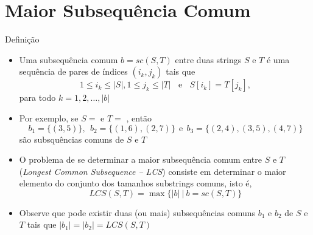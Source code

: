 \section{Maior Subsequência Comum}

\begin{frame}[fragile]{Definição}

    \begin{itemize}
        \item Uma subsequência comum $b = sc(S, T)$ entre duas strings $S$ e $T$ é uma sequência de
            pares de índices $(i_k, j_k)$ tais que 
        \[
            1\leq i_k\leq |S|, 1\leq j_k\leq |T| \ \ \ \ \mbox{e}\ \ \ \ S[i_k] = T[j_k],
        \]para todo $k = 1, 2, \ldots, |b|$

        \item  Por exemplo, se $S = $  e $T = $ , então
        \[
            b_1 = \lbrace (3, 5)\rbrace, \ \ b_2 = \lbrace (1, 6), (2, 7)\rbrace\ \ \mbox{e}\ \ b_3 = \lbrace (2, 4), (3, 5), (4, 7)\rbrace
        \] são subsquências comuns de $S$ e $T$

        \item O problema de se determinar a maior subsequência comum entre $S$ e $T$
            (\textit{Longest Common Subsequence -- LCS}) consiste em determinar o maior
            elemento do conjunto dos tamanhos substrings comuns, isto é,
        \[
            LCS(S, T) = \max \lbrace |b|\ | \ b = sc(S, T)\rbrace
        \]

        \item Observe que pode existir duas (ou mais)
            subsequências comuns $b_1$ e $b_2$ de $S$ e $T$ tais que $|b_1| = |b_2| = LCS(S, T)$

    \end{itemize}

\end{frame}

